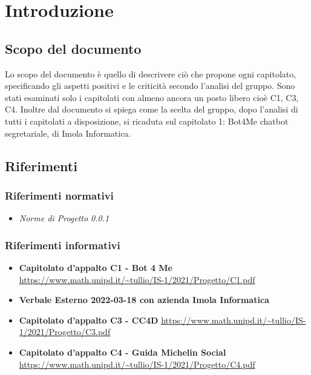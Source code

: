 \section{Introduzione}
		\subsection {Scopo del documento}
		Lo scopo del documento è quello di descrivere ciò che propone ogni capitolato, specificando gli aspetti positivi e le criticità secondo l'analisi del gruppo.
		\newline Sono stati esaminati solo i capitolati con almeno ancora un posto libero cioè C1, C3, C4. 
        Inoltre dal documento si spiega come la scelta del gruppo, dopo l'analisi di tutti i capitolati a disposizione, si ricaduta sul capitolato 1: 
        Bot4Me chatbot segretariale, di Imola Informatica.
		\subsection {Riferimenti} 
			\subsubsection {Riferimenti normativi} 
			\begin{itemize}
				\item \textit{Norme di Progetto 0.0.1}
			\end{itemize}
			\subsubsection {Riferimenti informativi} 
			\begin{itemize}
				\item \textbf{Capitolato d'appalto C1 - Bot 4 Me}\newline
				\url{https://www.math.unipd.it/~tullio/IS-1/2021/Progetto/C1.pdf}
				\item \textbf{Verbale Esterno 2022-03-18 con azienda Imola Informatica}
				\item \textbf{Capitolato d'appalto C3 - CC4D}\newline
				\url{https://www.math.unipd.it/~tullio/IS-1/2021/Progetto/C3.pdf}
				\item \textbf{Capitolato d'appalto C4 - Guida Michelin Social}\newline
				\url{https://www.math.unipd.it/~tullio/IS-1/2021/Progetto/C4.pdf}
			\end{itemize}